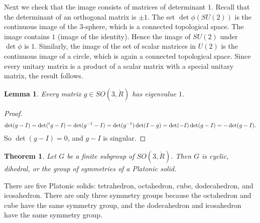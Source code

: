 \documentclass{amsart}
\newtheorem{theorem}[equation]{Theorem}
\newtheorem{lemma}[equation]{Lemma}
\def\t#1{\hbox{}^t#1}
\def\RR{\ring{R}}
\begin{document}
Next we check that the image consists of matrices of determinant $1$.
Recall that the determinant of an orthogonal matrix is $\pm 1$.
The set $\det\phi(SU(2))$ is the continuous image of the $3$-sphere, which is a connected topological space.  The
image contains $1$ (image of the identity).  Hence the image of $SU(2)$ under $\det\phi$ is $1$.  Similarly,
the image of the set of scalar matrices in $U(2)$ is the continuous image of a circle, which is again a connected
topological space.  Since every unitary matrix is a product of a scalar matrix with a special unitary matrix,
the result follows.

\begin{lemma} Every matrix $g\in SO(3,\RR)$ has  eigenvalue $1$.
\end{lemma}

\begin{proof}
\[
\det (g-I) = \det(\t{g}-I) = \det(g^{-1}-I) = \det(g^{-1})\det(I - g) = 
\det(-I)\det(g - I) = -\det(g-I).
\]
So $\det(g-I)=0$, and $g-I$ is singular.
\end{proof}

\begin{theorem}
Let $G$ be a finite subgroup of $SO(3,\RR)$.  Then $G$ is cyclic, dihedral,
or the group of symmetries of a Platonic solid.
\end{theorem}

There are five Platonic solids: tetrahedron, octahedron, cube, dodecahedron, and icosahedron.
There are only three symmetry groups because the octahedron and cube have the same symmetry group,
and the dodecahedron and icosahedron have the same symmetry group.
\end{document}
